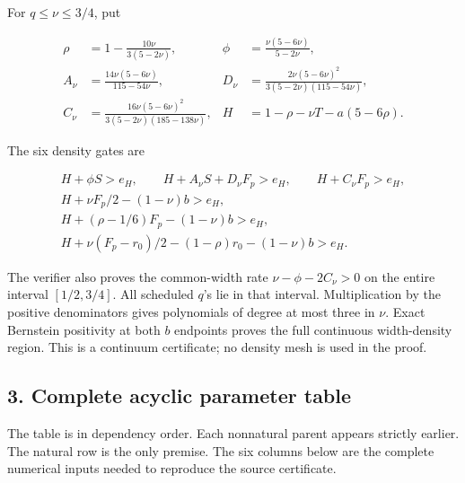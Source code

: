 For \(q\le\nu\le3/4\), put

\[
\begin{aligned}
\rho&=1-\frac{10\nu}{3(5-2\nu)},&
\phi&=\frac{\nu(5-6\nu)}{5-2\nu},\\
A_\nu&=\frac{14\nu(5-6\nu)}{115-54\nu},&
D_\nu&=\frac{2\nu(5-6\nu)^2}
 {3(5-2\nu)(115-54\nu)},\\
C_\nu&=\frac{16\nu(5-6\nu)^2}
 {3(5-2\nu)(185-138\nu)},&
H&=1-\rho-\nu T-a(5-6\rho).
\end{aligned}
\tag{S6}
\]

The six density gates are

\[
\begin{gathered}
H+\phi S>e_H,\qquad
H+A_\nu S+D_\nu F_p>e_H,\qquad
H+C_\nu F_p>e_H,\\
H+\nu F_p/2-(1-\nu)b>e_H,\\
H+(\rho-1/6)F_p-(1-\nu)b>e_H,\\
H+\nu(F_p-r_0)/2-(1-\rho)r_0-(1-\nu)b>e_H.
\end{gathered}
\tag{S7}
\]

The verifier also proves the common-width rate \(\nu-\phi-2C_\nu>0\) on the entire interval \([1/2,3/4]\). All scheduled \(q\)'s lie in that interval. Multiplication by the positive denominators gives polynomials of degree at most three in \(\nu\). Exact Bernstein positivity at both \(b\) endpoints proves the full continuous width-density region. This is a continuum certificate; no density mesh is used in the proof.

\hypertarget{sources:complete-acyclic-parameter-table}{%
\subsection{3. Complete acyclic parameter table}\label{sources:complete-acyclic-parameter-table}}

The table is in dependency order. Each nonnatural parent appears strictly earlier. The natural row is the only premise. The six columns below are the complete numerical inputs needed to reproduce the source certificate.


